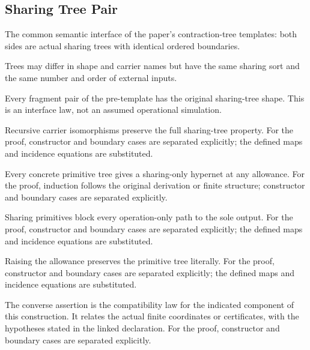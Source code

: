 \subsection{Sharing Tree Pair}
The common semantic interface of the paper's contraction-tree templates: both sides are actual sharing trees with identical ordered boundaries.

Trees may differ in shape and carrier names but have the same sharing sort and the same number and order of external inputs.
\par{}

Every fragment pair of the pre-template has the original sharing-tree shape. This is an interface law, not an assumed operational simulation.
\par{}

Recursive carrier isomorphisms preserve the full sharing-tree property.
For the proof, constructor and boundary cases are separated explicitly; the defined maps and incidence equations are substituted.
\par{}

Every concrete primitive tree gives a sharing-only hypernet at any allowance.
For the proof, induction follows the original derivation or finite structure; constructor and boundary cases are separated explicitly.
\par{}

Sharing primitives block every operation-only path to the sole output.
For the proof, constructor and boundary cases are separated explicitly; the defined maps and incidence equations are substituted.
\par{}

Raising the allowance preserves the primitive tree literally.
For the proof, constructor and boundary cases are separated explicitly; the defined maps and incidence equations are substituted.
\par{}

The converse assertion is the compatibility law for the indicated component of this construction. It relates the actual finite coordinates or certificates, with the hypotheses stated in the linked declaration.
For the proof, constructor and boundary cases are separated explicitly.
\par{}

